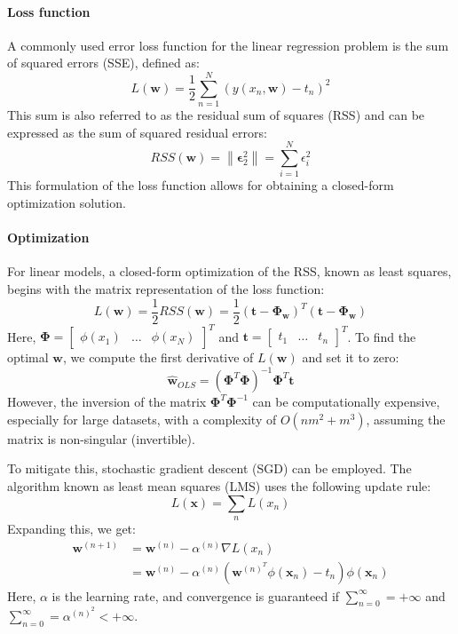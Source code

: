 \paragraph*{Loss function}
A commonly used error loss function for the linear regression problem is the sum of squared errors (SSE), defined as:
\[L(\textbf{w})=\dfrac{1}{2}\sum_{n=1}^{N}\left( y(x_n, \textbf{w})-t_n \right)^2\]
This sum is also referred to as the residual sum of squares (RSS) and can be expressed as the sum of squared residual errors:
\[RSS(\textbf{w})=\left\lVert \boldsymbol{\epsilon}^2_2 \right\rVert = \sum_{i=1}^{N}\epsilon^2_i \]
This formulation of the loss function allows for obtaining a closed-form optimization solution.

\paragraph*{Optimization}
For linear models, a closed-form optimization of the RSS, known as least squares, begins with the matrix representation of the loss function:
\[L(\textbf{w})=\dfrac{1}{2}RSS(\textbf{w})=\dfrac{1}{2}\left( \textbf{t}-\boldsymbol{\Phi}_{\textbf{w}} \right)^T\left( \textbf{t}-\boldsymbol{\Phi}_{\textbf{w}} \right)\]
Here, $\boldsymbol{\Phi}=\begin{bmatrix} \phi(x_1) & \dots & \phi(x_N)\end{bmatrix}^T$ and $\textbf{t}=\begin{bmatrix}t_1 & \dots & t_n\end{bmatrix}^T$.
To find the optimal $\textbf{w}$, we compute the first derivative of $L(\textbf{w})$ and set it to zero:
\[\widehat{\textbf{w}}_{OLS}=\left( \boldsymbol{\Phi}^T\boldsymbol{\Phi}\right)^{-1}\boldsymbol{\Phi}^T\textbf{t}\]
However, the inversion of the matrix $\boldsymbol{\Phi}^T\boldsymbol{\Phi}^{-1}$ can be computationally expensive, especially for large datasets, with a complexity of $O(nm^2+m^3)$, assuming the matrix is non-singular (invertible). 

To mitigate this, stochastic gradient descent (SGD) can be employed. 
The algorithm known as least mean squares (LMS) uses the following update rule:
\[L(\textbf{x})=\sum_nL(x_n)\]
Expanding this, we get:
\begin{align*}
    \textbf{w}^{(n+1)}  &= \textbf{w}^{(n)}-\alpha^{(n)}\nabla L(x_n) \\
                        &= \textbf{w}^{(n)}-\alpha^{(n)}\left( \textbf{w}^{(n)^T}\phi(\textbf{x}_n)-t_n \right)\phi(\textbf{x}_n)
\end{align*}
Here, $\alpha$ is the learning rate, and convergence is guaranteed if $\sum_{n=0}^{\infty}=+\infty$ and $\sum_{n=0}^{\infty}=\alpha^{(n)^2}<+\infty$.

